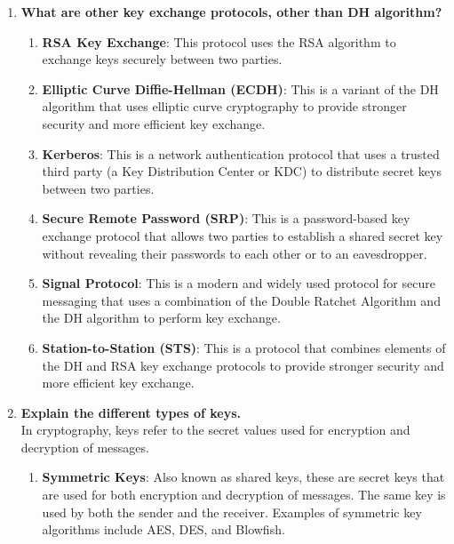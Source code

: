 \documentclass[11pt]{article}
\begin{document}
\begin{enumerate}
    \item \textbf{What are other key exchange protocols, other than DH algorithm?}

          \begin{enumerate}
              \item \textbf{RSA Key Exchange}: This protocol uses the RSA algorithm to exchange keys securely between two parties.
              \item \textbf{Elliptic Curve Diffie-Hellman (ECDH)}: This is a variant of the DH algorithm that uses elliptic curve cryptography to provide stronger security and more efficient key exchange.
              \item \textbf{Kerberos}: This is a network authentication protocol that uses a trusted third party (a Key Distribution Center or KDC) to distribute secret keys between two parties.
              \item \textbf{Secure Remote Password (SRP)}: This is a password-based key exchange protocol that allows two parties to establish a shared secret key without revealing their passwords to each other or to an eavesdropper.
              \item \textbf{Signal Protocol}: This is a modern and widely used protocol for secure messaging that uses a combination of the Double Ratchet Algorithm and the DH algorithm to perform key exchange.
              \item \textbf{Station-to-Station (STS)}: This is a protocol that combines elements of the DH and RSA key exchange protocols to provide stronger security and more efficient key exchange.
          \end{enumerate}

    \item \textbf{Explain the different types of keys.}\\

          In cryptography, keys refer to the secret values used for encryption and decryption of messages.

          \begin{enumerate}

              \item \textbf{Symmetric Keys}: Also known as shared keys, these are secret keys that are used for both encryption and decryption of messages. The same key is used by both the sender and the receiver. Examples of symmetric key algorithms include AES, DES, and Blowfish.


\end{enumerate}
\end{enumerate}
\end{document}

